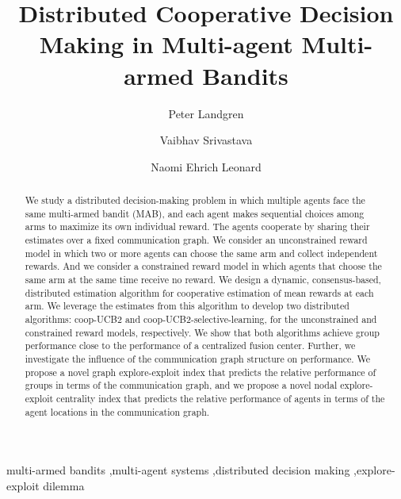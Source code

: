 \documentclass[final,5p,times,twocolumn]{elsarticle}
\theoremstyle{definition}
\begin{document}
\begin{frontmatter}


\title{Distributed Cooperative Decision Making in Multi-agent Multi-armed Bandits }


\author[label1]{Peter Landgren}
\author[label2]{ Vaibhav Srivastava}
\author[label1]{Naomi Ehrich Leonard}


\address[label1]{Department of Mechanical \& Aerospace Engineering, Princeton University, New Jersey, USA, \emph{\tt{ \{landgren, naomi\}@princeton.edu}}}
\address[label2]{Department of Electrical and Computer Engineering, Michigan State University, East Lansing, MI, USA, \tt{vaibhav@egr.msu.edu}}
\begin{abstract}
	We study a distributed decision-making problem in which multiple agents face the same multi-armed bandit (MAB), and each agent makes sequential choices among arms to maximize its own individual reward. The agents cooperate by sharing their estimates over a fixed communication graph. We consider an unconstrained reward model in which two or more agents can choose the same arm and collect independent rewards. And we consider a constrained reward model in which agents that choose the same arm at the same time receive no reward. We design a dynamic, consensus-based, distributed estimation algorithm for cooperative estimation of mean rewards at each arm. We leverage the estimates from this algorithm to develop two distributed algorithms: coop-UCB2 and coop-UCB2-selective-learning, for the unconstrained and constrained reward models, respectively. We show that both algorithms achieve group performance close to the performance of a centralized fusion center.  Further, we investigate the influence of the communication graph structure on performance. We propose a novel graph explore-exploit index that predicts the relative performance of groups in terms of the communication graph, and we propose a novel nodal explore-exploit centrality index that predicts the relative performance of agents in terms of the agent locations in the communication graph. %
\end{abstract}

\begin{keyword}
multi-armed bandits \sep multi-agent systems \sep distributed decision making \sep explore-exploit dilemma
\end{keyword}

\end{frontmatter}
\end{document}
